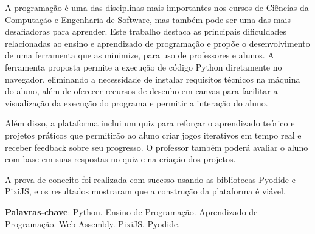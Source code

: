 \begin{resumo}
    A programação é uma das disciplinas mais importantes nos cursos de Ciências da Computação e Engenharia de Software, mas também pode ser uma das mais desafiadoras para aprender. Este trabalho destaca as principais dificuldades relacionadas ao ensino e aprendizado de programação e propõe o desenvolvimento de uma ferramenta que as minimize, para uso de professores e alunos. A ferramenta proposta permite a execução de código Python diretamente no navegador, eliminando a necessidade de instalar requisitos técnicos na máquina do aluno, além de oferecer recursos de desenho em canvas para facilitar a visualização da execução do programa e permitir a interação do aluno.

    Além disso, a plataforma inclui um quiz para reforçar o aprendizado teórico e projetos práticos que permitirão ao aluno criar jogos iterativos em tempo real e receber feedback sobre seu progresso. O professor também poderá avaliar o aluno com base em suas respostas no quiz e na criação dos projetos.

    A prova de conceito foi realizada com sucesso usando as bibliotecas Pyodide e PixiJS, e os resultados mostraram que a construção da plataforma é viável.

 \vspace{\onelineskip}

 \noindent
 \textbf{Palavras-chave}:  Python. Ensino de Programação. Aprendizado de Programação. Web Assembly. PixiJS. Pyodide.
\end{resumo}
